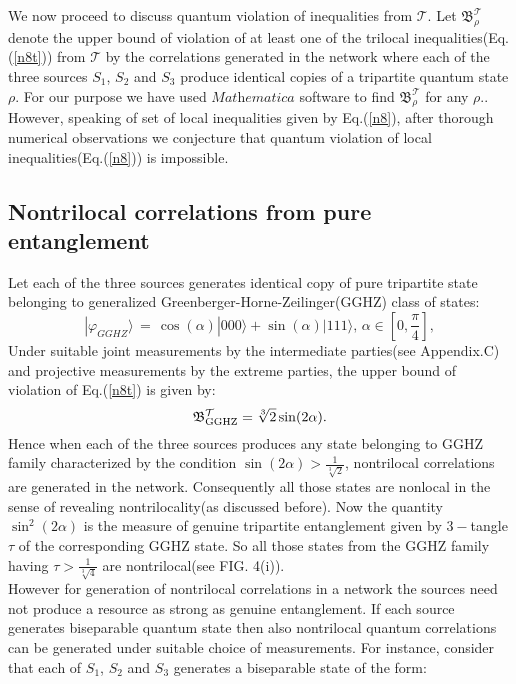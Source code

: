 \documentclass[pra,10pt,twocolumn,superscriptaddress,floatfix,showpacs]{revtex4-1}
\begin{document}
We now proceed to discuss  quantum violation of inequalities from $\mathcal{T}$. Let $\mathfrak{B}^\mathcal{T}_{\rho}$ denote the upper bound of violation of at least one of the trilocal inequalities(Eq.(\ref{n8t})) from $\mathcal{T}$ by the correlations generated in the network where each of the three sources $S_1$, $S_2$ and $S_3$  produce identical copies of a tripartite quantum state $\rho.$ For our purpose we have used $\textit{Mathematica}$ software\cite{mathe} to find $\mathfrak{B}^\mathcal{T}_{\rho}$ for any $\rho.$. However, speaking of set of local inequalities given by Eq.(\ref{n8}), after thorough numerical observations we conjecture that quantum violation of local inequalities(Eq.(\ref{n8})) is impossible.
\subsection{Nontrilocal correlations from pure entanglement}
Let each of the three sources generates identical copy of pure tripartite state belonging to generalized Greenberger-Horne-Zeilinger(GGHZ) class of states\cite{ACN}:
\begin{equation}\label{S15}
 |\varphi_{GGHZ}\rangle\,=\,\cos(\alpha)|000\rangle+\sin(\alpha)|111\rangle,\,\alpha\in[0,\frac{\pi}{4}],
\end{equation}
Under suitable joint measurements by the intermediate parties(see Appendix.C) and projective measurements by the extreme parties, the upper bound of violation of Eq.(\ref{n8t}) is given by:
\begin{equation}\label{g1}
    \mathfrak{B}^\mathcal{T}_{\textmd{GGHZ}}=\sqrt[3]{2}\sin(2\alpha).
\end{equation}
Hence when each of the three sources produces any state belonging to GGHZ family characterized by the condition $\sin(2\alpha)>\frac{1}{\sqrt[3]{2}}$, nontrilocal correlations are generated in the network. Consequently all those states are nonlocal in the sense of revealing nontrilocality(as discussed before). Now the quantity $\sin^2(2\alpha)$ is the measure of genuine tripartite entanglement given by $3-$tangle $\tau$\cite{COF} of the corresponding GGHZ state. So all those states from the GGHZ family having $\tau>\frac{1}{\sqrt[3]{4}}$ are nontrilocal(see FIG. 4(i)).\\
However for generation of nontrilocal correlations in a network the sources need not produce a  resource as strong as  genuine entanglement. If each source generates biseparable quantum state then also nontrilocal quantum correlations can be generated under suitable choice of measurements. For instance, consider that each of $S_1$, $S_2$ and $S_3$  generates a  biseparable state of the form:
\end{document}
